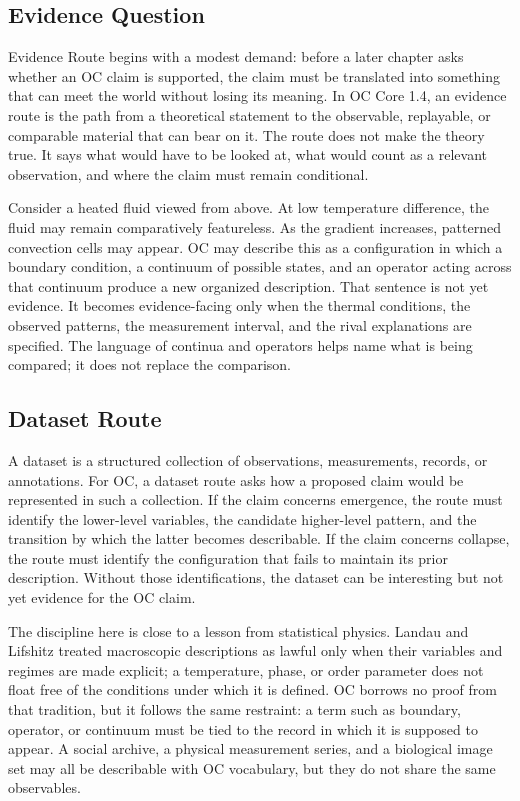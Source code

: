 \documentclass[11pt,a4paper,openany]{book}
\begin{document}
\subsection{Evidence Question}
Evidence Route begins with a modest demand: before a later chapter asks whether an OC claim is supported, the claim must be translated into something that can meet the world without losing its meaning. In OC Core 1.4, an evidence route is the path from a theoretical statement to the observable, replayable, or comparable material that can bear on it. The route does not make the theory true. It says what would have to be looked at, what would count as a relevant observation, and where the claim must remain conditional. \cite{wilson_renormalization,landau_stat_physics}\par
Consider a heated fluid viewed from above. At low temperature difference, the fluid may remain comparatively featureless. As the gradient increases, patterned convection cells may appear. OC may describe this as a configuration in which a boundary condition, a continuum of possible states, and an operator acting across that continuum produce a new organized description. That sentence is not yet evidence. It becomes evidence-facing only when the thermal conditions, the observed patterns, the measurement interval, and the rival explanations are specified. The language of continua and operators helps name what is being compared; it does not replace the comparison.\par
\subsection{Dataset Route}
A dataset is a structured collection of observations, measurements, records, or annotations. For OC, a dataset route asks how a proposed claim would be represented in such a collection. If the claim concerns emergence, the route must identify the lower-level variables, the candidate higher-level pattern, and the transition by which the latter becomes describable. If the claim concerns collapse, the route must identify the configuration that fails to maintain its prior description. Without those identifications, the dataset can be interesting but not yet evidence for the OC claim. \cite{wilson_renormalization,landau_stat_physics}\par
The discipline here is close to a lesson from statistical physics. Landau and Lifshitz treated macroscopic descriptions as lawful only when their variables and regimes are made explicit; a temperature, phase, or order parameter does not float free of the conditions under which it is defined. OC borrows no proof from that tradition, but it follows the same restraint: a term such as boundary, operator, or continuum must be tied to the record in which it is supposed to appear. A social archive, a physical measurement series, and a biological image set may all be describable with OC vocabulary, but they do not share the same observables.\par
\end{document}
